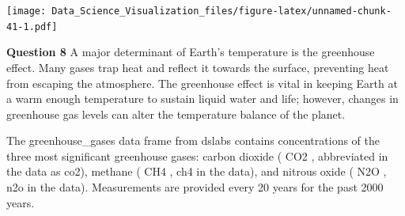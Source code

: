 \documentclass[
]{article}
\newenvironment{Shaded}{\begin{snugshade}}{\end{snugshade}}
\newcommand{\DataTypeTok}[1]{\textcolor[rgb]{0.13,0.29,0.53}{#1}}
\newcommand{\DecValTok}[1]{\textcolor[rgb]{0.00,0.00,0.81}{#1}}
\newcommand{\FloatTok}[1]{\textcolor[rgb]{0.00,0.00,0.81}{#1}}
\newcommand{\KeywordTok}[1]{\textcolor[rgb]{0.13,0.29,0.53}{\textbf{#1}}}
\newcommand{\NormalTok}[1]{#1}
\newcommand{\OperatorTok}[1]{\textcolor[rgb]{0.81,0.36,0.00}{\textbf{#1}}}
\newcommand{\StringTok}[1]{\textcolor[rgb]{0.31,0.60,0.02}{#1}}
\begin{document}
\begin{Shaded}
\end{Shaded}

\texttt{[image: Data\_Science\_Visualization\_files/figure-latex/unnamed-chunk-41-1.pdf]}

\textbf{Question 8} A major determinant of Earth's temperature is the
greenhouse effect. Many gases trap heat and reflect it towards the
surface, preventing heat from escaping the atmosphere. The greenhouse
effect is vital in keeping Earth at a warm enough temperature to sustain
liquid water and life; however, changes in greenhouse gas levels can
alter the temperature balance of the planet.

The greenhouse\_gases data frame from dslabs contains concentrations of
the three most significant greenhouse gases: carbon dioxide ( CO2 ,
abbreviated in the data as co2), methane ( CH4 , ch4 in the data), and
nitrous oxide ( N2O , n2o in the data). Measurements are provided every
20 years for the past 2000 years.
\end{document}
